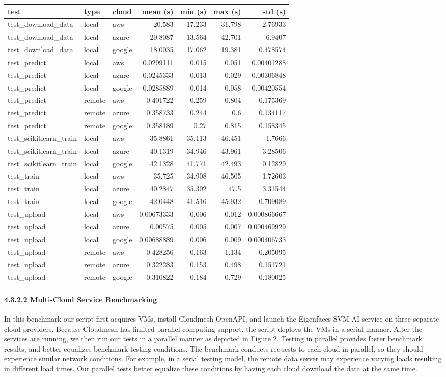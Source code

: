 \begin{tabular}[]{@{}lllrrrr@{}}
\toprule
test & type & cloud & mean (s) & min (s) & max (s) & std
(s)\tabularnewline
\midrule
test\_download\_data & local & aws & 20.583 & 17.233 & 31.798 &
2.76933\tabularnewline
test\_download\_data & local & azure & 20.8087 & 13.564 & 42.701 &
6.9407\tabularnewline
test\_download\_data & local & google & 18.0035 & 17.062 & 19.381 &
0.478574\tabularnewline
test\_predict & local & aws & 0.0299111 & 0.015 & 0.051 &
0.00401288\tabularnewline
test\_predict & local & azure & 0.0245333 & 0.013 & 0.029 &
0.00306848\tabularnewline
test\_predict & local & google & 0.0285889 & 0.014 & 0.058 &
0.00420554\tabularnewline
test\_predict & remote & aws & 0.401722 & 0.259 & 0.804 &
0.175369\tabularnewline
test\_predict & remote & azure & 0.358733 & 0.244 & 0.6 &
0.134117\tabularnewline
test\_predict & remote & google & 0.358189 & 0.27 & 0.815 &
0.158345\tabularnewline
test\_scikitlearn\_train & local & aws & 35.8861 & 35.113 & 46.451 &
1.7666\tabularnewline
test\_scikitlearn\_train & local & azure & 40.1319 & 34.946 & 43.961 &
3.28506\tabularnewline
test\_scikitlearn\_train & local & google & 42.1328 & 41.771 & 42.493 &
0.12829\tabularnewline
test\_train & local & aws & 35.725 & 34.908 & 46.505 &
1.72603\tabularnewline
test\_train & local & azure & 40.2847 & 35.302 & 47.5 &
3.31544\tabularnewline
test\_train & local & google & 42.0448 & 41.516 & 45.932 &
0.709089\tabularnewline
test\_upload & local & aws & 0.00673333 & 0.006 & 0.012 &
0.000866667\tabularnewline
test\_upload & local & azure & 0.00575 & 0.005 & 0.007 &
0.000469929\tabularnewline
test\_upload & local & google & 0.00688889 & 0.006 & 0.009 &
0.000406733\tabularnewline
test\_upload & remote & aws & 0.428256 & 0.163 & 1.134 &
0.205095\tabularnewline
test\_upload & remote & azure & 0.322283 & 0.153 & 0.498 &
0.151721\tabularnewline
test\_upload & remote & google & 0.310822 & 0.184 & 0.729 &
0.180025\tabularnewline
\bottomrule
\end{tabular}

\hypertarget{multi-cloud-service-benchmarking}{%
\paragraph{4.3.2.2 Multi-Cloud Service
Benchmarking}\label{multi-cloud-service-benchmarking}}

In this benchmark our script first acquires VMs, install Cloudmesh
OpenAPI, and launch the Eigenfaces SVM AI service on three separate
cloud providers. Because Cloudmesh has limited parallel computing
support, the script deploys the VMs in a serial manner. After the
services are running, we then run our tests in a parallel manner as
depicted in Figure 2. Testing in parallel provides faster benchmark
results, and better equalizes benchmark testing conditions. The
benchmark conducts requests to each cloud in parallel, so they should
experience similar network conditions. For example, in a serial testing
model, the remote data server may experience varying loads resulting in
different load times. Our parallel tests better equalize these
conditions by having each cloud download the data at the same time.

